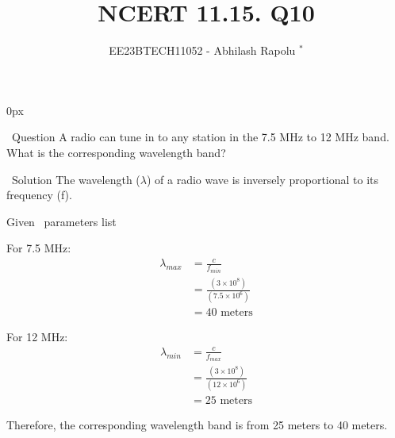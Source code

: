 \documentclass[journal,12pt,twocolumn]{IEEEtran}
\begin{document}


\vspace{3cm}
\title{NCERT 11.15. Q10}
\author{EE23BTECH11052 - Abhilash Rapolu $^{*}$%
}
\maketitle

\newpage
\bigskip
\renewcommand{\thetable}{\arabic{table}}

\parindent 0px

\ Question
A radio can tune in to any station in the 7.5 MHz to 12 MHz band. What is the corresponding wavelength band?

\ Solution
The wavelength ($\lambda$) of a radio wave is inversely proportional to its frequency (f).

\begin{table}[htbp] \small
\centering

\caption{Given \, parameters list}
\end{table}

For 7.5 MHz:
\begin{align}
\lambda_{max} &= \frac{c}{f_{min}} \\
&= \frac{(3\times10^{8})}{(7.5\times10^{6})} \\
&= 40 \text{ meters}
\end{align}

For 12 MHz:
\begin{align}
\lambda_{min} &= \frac{c}{f_{max}} \\
&= \frac{(3\times10^{8})}{(12\times10^{6})} \\
&= 25 \text{ meters}
\end{align}

Therefore, the corresponding wavelength band is from 25 meters to 40 meters.
\end{document}
